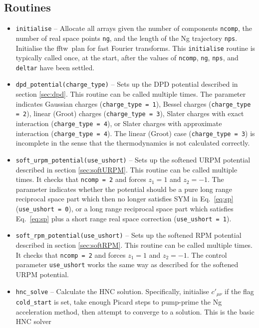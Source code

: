 \documentclass[12pt,a4paper]{article}
\newcommand{\Eqref}[1]{Eq.~\eqref{#1}}
\newcommand{\FFTW}{{\sc fftw}}
\begin{document}
\subsection{Routines}
%
\begin{itemize}
%
\item\verb+initialise+ -- Allocate all arrays given the number of
  components \verb+ncomp+, the number of real space points \verb+ng+,
  and the length of the Ng trajectory \verb+nps+.  Initialise the
  \FFTW\ plan for fast Fourier transforms.  This \verb+initialise+
  routine is typically called once, at the start, after the values of
  \verb+ncomp+, \verb+ng+, \verb+nps+, and \verb+deltar+ have been
  settled.
%
\item\verb+dpd_potential(charge_type)+ -- Sets up the DPD potential
  described in section \ref{sec:dpd}.  This routine can be called
  multiple times.  The parameter indicates Gaussian charges
  (\verb+charge_type = 1+), Bessel charges (\verb+charge_type = 2+),
  linear (Groot) charges (\verb+charge_type = 3+), Slater charges with
  exact interaction (\verb+charge_type = 4+), or Slater charges with
  approximate interaction (\verb+charge_type = 4+).  The linear
  (Groot) case (\verb+charge_type = 3+) is incomplete in the sense
  that the thermodynamics is not calculated correctly.
%
\item\verb+soft_urpm_potential(use_ushort)+ -- Sets up the
  softened URPM potential described in section \ref{sec:softURPM}.
  This routine can be called multiple times.  It checks that
  \verb+ncomp = 2+ and forces $z_1=1$ and $z_2=-1$.  The parameter
  indicates whether the potential should be a pure long range
  reciprocal space part which then no longer satisfies SYM in
  \Eqref{eq:sp} (\verb+use_ushort = 0+), or a long range
  reciprocal space part which satisfies \Eqref{eq:sp} plus a short
  range real space correction (\verb+use_ushort = 1+).
%
\item\verb+soft_rpm_potential(use_ushort)+ -- Sets up the softened RPM
  potential described in section \ref{sec:softRPM}.  This routine can
  be called multiple times.  It checks that \verb+ncomp = 2+ and
  forces $z_1=1$ and $z_2=-1$.  The control parameter
  \verb+use_ushort+ works the same way as described for the softened
  URPM potential.
%
\item\verb+hnc_solve+ -- Calculate the HNC solution.  Specifically,
  initialise $c'_{\mu\nu}$ if the flag \verb+cold_start+ is set, take
  enough Picard steps to pump-prime the Ng acceleration method, then
  attempt to converge to a solution.  This is the basic HNC solver

\end{itemize}
\end{document}
